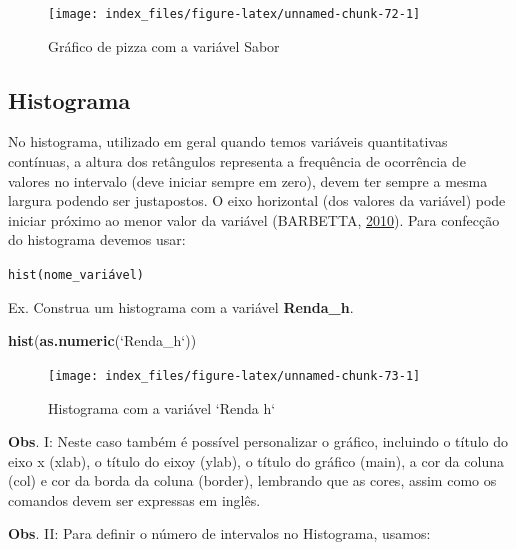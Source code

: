 \documentclass[12pt,brazil,oneside]{book}
\newenvironment{Shaded}{\begin{snugshade}}{\end{snugshade}}
\newcommand{\DataTypeTok}[1]{\textcolor[rgb]{0.13,0.29,0.53}{#1}}
\newcommand{\KeywordTok}[1]{\textcolor[rgb]{0.13,0.29,0.53}{\textbf{#1}}}
\newcommand{\NormalTok}[1]{#1}
\newcommand{\StringTok}[1]{\textcolor[rgb]{0.31,0.60,0.02}{#1}}
\begin{document}
\begin{figure}[H]

{\centering \texttt{[image: index\_files/figure-latex/unnamed-chunk-72-1]} 

}

\caption{Gráfico de pizza com a variável Sabor}\label{fig:unnamed-chunk-72}
\end{figure}

\hypertarget{histograma}{%
\subsection{Histograma}\label{histograma}}

No histograma, utilizado em geral quando temos variáveis quantitativas
contínuas, a altura dos retângulos representa a frequência de ocorrência
de valores no intervalo (deve iniciar sempre em zero), devem ter sempre
a mesma largura podendo ser justapostos. O eixo horizontal (dos valores
da variável) pode iniciar próximo ao menor valor da variável (BARBETTA,
\protect\hyperlink{ref-barbetta1988}{2010}). Para confecção do
histograma devemos usar:

\texttt{hist(nome\_variável)}

Ex. Construa um histograma com a variável \textbf{Renda\_h}.

\begin{Shaded}
\begin{Highlighting}[]
\KeywordTok{hist}\NormalTok{(}\KeywordTok{as.numeric}\NormalTok{(}\StringTok{`}\DataTypeTok{Renda_h}\StringTok{`}\NormalTok{))}
\end{Highlighting}
\end{Shaded}

\begin{figure}[H]

{\centering \texttt{[image: index\_files/figure-latex/unnamed-chunk-73-1]} 

}

\caption{Histograma com a variável `Renda h`}\label{fig:unnamed-chunk-73}
\end{figure}

\textbf{Obs}. I: Neste caso também é possível personalizar o gráfico,
incluindo o título do eixo x (xlab), o título do eixoy (ylab), o título
do gráfico (main), a cor da coluna (col) e cor da borda da coluna
(border), lembrando que as cores, assim como os comandos devem ser
expressas em inglês.

\textbf{Obs}. II: Para definir o número de intervalos no Histograma,
usamos:
\end{document}

